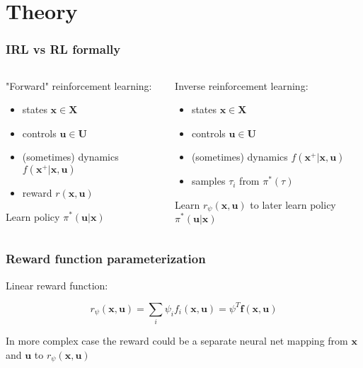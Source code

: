 \section{Theory}

\begin{frame}
    \frametitle{IRL vs RL formally}

    \begin{columns}[t] %
        \begin{column}{0.5\textwidth} %
            "Forward" reinforcement learning:
            \begin{itemize}
                \item states $\mathbf{x} \in \mathbf{X}$
                \item controls $\mathbf{u} \in \mathbf{U}$
                \item (sometimes) dynamics $f(\mathbf{x}^{+} | \mathbf{x}, \mathbf{u})$
                \item reward $r(\mathbf{x}, \mathbf{u})$
            \end{itemize}

            Learn policy $\pi^{\ast} (\mathbf{u} | \mathbf{x})$
        \end{column}
        \begin{column}{0.5\textwidth} %
            Inverse reinforcement learning:
            \begin{itemize}
                \item states $\mathbf{x} \in \mathbf{X}$
                \item controls $\mathbf{u} \in \mathbf{U}$
                \item (sometimes) dynamics $f(\mathbf{x}^{+} | \mathbf{x}, \mathbf{u})$
                \item samples ${\tau_i}$ from $\pi^{\ast}(\tau)$
            \end{itemize}

            Learn $r_{\psi}(\mathbf{x}, \mathbf{u})$ to later learn policy $\pi^{\ast} (\mathbf{u} | \mathbf{x})$
        \end{column}
    \end{columns}

\end{frame}

\begin{frame}
    \frametitle{Reward function parameterization}

    Linear reward function:

    \begin{equation}
        r_{\psi}(\mathbf{x}, \mathbf{u}) = \sum_{i} \psi_i f_i(\mathbf{x}, \mathbf{u}) = \psi^T \mathbf{f(\mathbf{x}, \mathbf{u})}
    \end{equation}

    In more complex case the reward could be a separate neural net mapping from $\mathbf{x}$ and $\mathbf{u}$ to $r_\psi(\mathbf{x}, \mathbf{u})$


\end{frame}